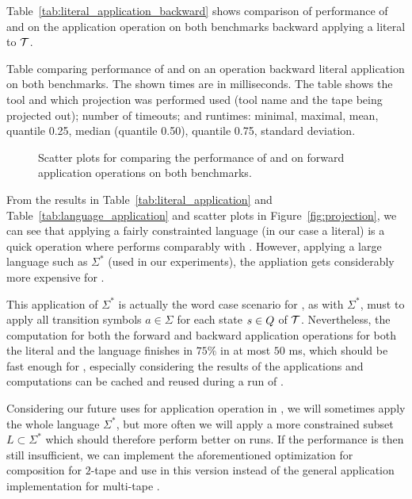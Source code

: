 Table~\ref{tab:literal_application_backward} shows comparison of performance of \mata and \mona on the application operation on both benchmarks backward applying a literal to $\mathcal{T}$.

\begin{table}[ht]
  \centering
  
  \caption{
    Table comparing performance of \mata and \mona on an operation backward literal application on both benchmarks.
    The shown times are in milliseconds.
    The table shows the tool and which projection was performed used (tool name and the tape being projected out); number of timeouts; and runtimes: minimal, maximal, mean, quantile 0.25, median (quantile 0.50), quantile 0.75, standard deviation.
  }
  \label{tab:literal_application_backward}
\end{table}

\begin{figure}[ht]
    \centering
    \quad
    \caption{
      Scatter plots for comparing the performance of \mata and \mona on forward application operations on both benchmarks.
    }
    \label{fig:apply_operation}%
\end{figure}

From the results in Table~\ref{tab:literal_application} and Table~\ref{tab:language_application} and scatter plots in Figure~\ref{fig:projection}, we can see that applying a fairly constrainted language (in our case a literal) is a quick operation where \mata performs comparably with \mona.
However, applying a large language such as $\Sigma^*$ (used in our experiments), the appliation gets considerably more expensive for \mata.

This application of $\Sigma^*$ is actually the word case scenario for \mata, as with $\Sigma^*$, \mata must to apply all transition symbols $a \in \Sigma$ for each state $s \in Q$ of $\mathcal{T}$.
Nevertheless, the computation for both the forward and backward application operations for both the literal and the language finishes in $75\%$ in at most $50$ ms, which should be fast enough for \noodler, especially considering the results of the applications and computations can be cached and reused during a run of \noodler.

Considering our future uses for application operation in \noodler, we will sometimes apply the whole language $\Sigma^*$, but more often we will apply a more constrained subset $L \subset \Sigma^*$ which should therefore perform better on \noodler runs.
If the performance is then still insufficient, we can implement the aforementioned optimization for composition for $2$-tape \nfts and use in \noodler this version instead of the general application implementation for multi-tape \nfts.

